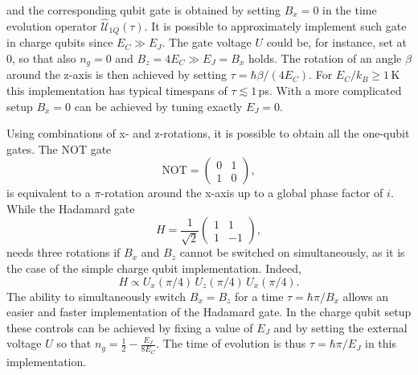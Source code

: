 \documentclass[../main/main.tex]{subfiles}
\begin{document}
and the corresponding qubit gate is obtained by setting $B_x=0$ in the time evolution operator $\hat{\mathcal{U}}_{1Q}(\tau)$. It is possible to approximately implement such gate in charge qubits since $E_C \gg E_J$. The gate voltage $U$ could be, for instance, set at 0, so that also $n_g=0$ and $B_z=4 E_C \gg E_J = B_x$ holds. The rotation of an angle $\beta$ around the z-axis is then achieved by setting $\tau=\hbar \beta/(4 E_C)$. For $E_C/k_B \geq 1\,$K this implementation has typical timespans of $\tau \lesssim 1\,$ps. With a more complicated setup $B_x=0$ can be achieved by tuning exactly $E_J=0$. \par
Using combinations of x- and z-rotations, it is possible to obtain all the one-qubit gates. The NOT gate
\begin{equation} \label{eq:NOT_gate}
    \text{NOT} = {\begin{pmatrix}
    0
    &
    1
    \\
    1
    &
    0
    \end{pmatrix}},
\end{equation}
is equivalent to a $\pi$-rotation around the x-axis up to a global phase factor of $i$. While the Hadamard gate
\begin{equation} \label{eq:Hadamard_gate}
    H = \frac{1}{\sqrt{2}}{\begin{pmatrix}
    1
    &
    1
    \\
    1
    &
    -1
    \end{pmatrix}},
\end{equation}
needs three rotations if $B_x$ and $B_z$ cannot be switched on simultaneously, as it is the case of the simple charge qubit implementation. Indeed,
\begin{equation} \label{eq:Hadamard_gate_xz_rotation_implementation}
    H \propto U_x(\pi/4)\, U_z(\pi/4)\, U_x(\pi/4).
\end{equation}
The ability to simultaneously switch $B_x=B_z$ for a time $\tau=\hbar \pi/B_x$ allows an easier and faster implementation of the Hadamard gate. In the charge qubit setup these controls can be achieved by fixing a value of $E_J$ and by setting the external voltage $U$ so that $n_g = \frac{1}{2}-\frac{E_J}{8 E_C}$. The time of evolution is thus $\tau = \hbar \pi/E_J$ in this implementation.
\end{document}

